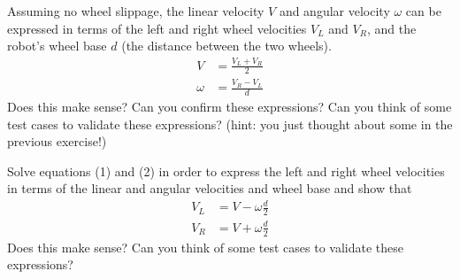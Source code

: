\documentclass{tufte-handout}
\begin{document}
\vspace{1em}
\begin{myboxi}[Exercise 2]
Assuming no wheel slippage, the linear velocity $V$ and angular velocity $\omega$ can be expressed in terms of the left and right wheel velocities $V_L$ and $V_R$, and the robot's wheel base $d$ (the distance between the two wheels).
\begin{align}
V &= \frac{V_L + V_R}{2} \\
\omega &= \frac{V_R - V_L}{d}
\end{align}
Does this make sense? Can you confirm these expressions? Can you think of some test cases to validate these expressions? (hint: you just thought about some in the previous exercise!)
\end{myboxi}
\vspace{1em}

\vspace{1em}
\begin{myboxi}[Exercise 3]
Solve equations (1) and (2) in order to express the left and right wheel velocities in terms of the linear and angular velocities and wheel base and show that
\begin{align}
V_L &= V - \omega \frac{d}{2} \\
V_R &= V + \omega  \frac{d}{2}
\end{align}
Does this make sense? Can you think of some test cases to validate these expressions?
\end{myboxi}
\vspace{1em}
\end{document}
